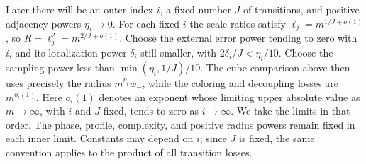 \begin{remark}\label{pkt:vanishing-powers}
Later there will be an outer index $i$, a fixed number $J$ of
transitions, and positive adjacency powers $\eta_i\to0$.  For each
fixed $i$ the scale ratios satisfy
$\ell_j=m^{1/J+o(1)}$, so $R=\ell_j^2=m^{2/J+o(1)}$.
Choose the external error power tending to zero with $i$, and its
localization power $\delta_i$ still smaller, with
$2\delta_i/J<\eta_i/10$.  Choose the sampling power less than
$\min(\eta_i,1/J)/10$.  The cube comparison above then uses precisely
the radius $m^{\eta_i}w_-$, while the coloring and decoupling losses
are $m^{o_i(1)}$.  Here $o_i(1)$ denotes an exponent whose limiting
upper absolute value as $m\to\infty$, with $i$ and $J$ fixed, tends
to zero as $i\to\infty$.  We take the limits in that order.  The
phase, profile, complexity, and positive radius powers remain fixed
in each inner limit.  Constants may depend on $i$; since $J$ is fixed,
the same convention applies to the product of all transition losses.
\end{remark}
